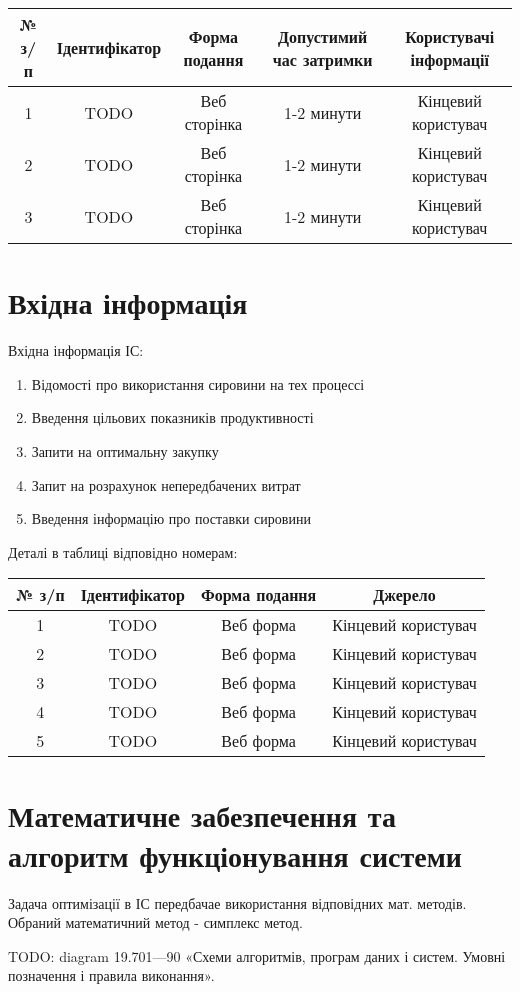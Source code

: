 {\small
\begin{center}
\begin{tabular}{ | c | c | c | c | c | }
\hline
 № з/п  & Ідентифікатор & Форма подання & Допустимий час затримки & Користувачі інформації \\ 
\hline
 1 & TODO & Веб сторінка & 1-2 минути & Кінцевий користувач \\  
\hline
 2 & TODO & Веб сторінка & 1-2 минути & Кінцевий користувач \\  
\hline
 3 & TODO & Веб сторінка & 1-2 минути & Кінцевий користувач \\  
\hline
\end{tabular}
\end{center}
}

\section{Вхідна інформація}

Вхідна інформація ІС: 

\begin{enumerate}
	\item Відомості про використання сировини на тех процессі
	\item Введення цільових показників продуктивності
	\item Запити на оптимальну закупку
	\item Запит на розрахунок непередбачених витрат
	\item Введення інформацію про поставки сировини
\end{enumerate}

Деталі в таблиці відповідно номерам:

{\small
\begin{center}
\begin{tabular}{ | c | c | c | c |  }
\hline
 № з/п  & Ідентифікатор & Форма подання & Джерело \\ 
\hline
 1 & TODO & Веб форма & Кінцевий користувач \\  
\hline
 2 & TODO & Веб форма & Кінцевий користувач \\  
\hline
 3 & TODO & Веб форма & Кінцевий користувач \\  
\hline
 4 & TODO & Веб форма & Кінцевий користувач \\  
\hline
 5 & TODO & Веб форма & Кінцевий користувач \\  
\hline
\end{tabular}
\end{center}
}

\section{Математичне забезпечення та алгоритм функціонування системи}

Задача оптимізації в ІС передбачае використання відповідних мат. методів. Обраний математичний метод - симплекс метод.

TODO: diagram 19.701—90 «Схеми алгоритмів, програм даних і систем. Умовні позначення і правила виконання».


